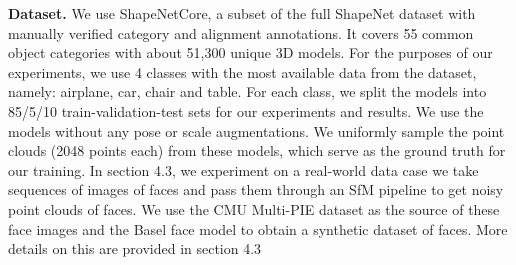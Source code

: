 \documentclass[10pt,twocolumn,letterpaper]{article}
\begin{document}
\textbf{Dataset.} We use ShapeNetCore, a subset of the full ShapeNet\cite{shapenet} dataset with manually verified category and alignment annotations. It covers 55 common object categories with about 51,300 unique 3D models. For the purposes of our experiments, we use 4 classes with the most available data from the dataset, namely: airplane, car, chair and table. For each class, we split the models into 85/5/10 train-validation-test sets for our experiments and results. We use the models without any pose or scale augmentations. We uniformly sample the point clouds (2048 points each) from these models, which serve as the ground truth for our training. 
In section 4.3, we experiment on a real-world data case we take sequences of images of faces and pass them through an SfM pipeline to get noisy point clouds of faces. We use the CMU Multi-PIE \cite{multipie} dataset as the source of these face images and the Basel face model \cite{basel} to obtain a synthetic dataset of faces. More details on this are provided in section 4.3
\end{document}
